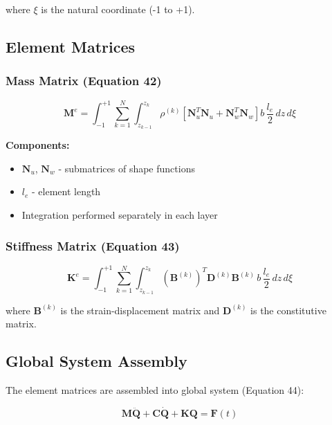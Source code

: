 \documentclass[12pt,a4paper]{article}
\begin{document}
where $\xi$ is the natural coordinate (-1 to +1).

\subsection{Element Matrices}

\subsubsection{Mass Matrix (Equation 42)}

\begin{equation}
    \mathbf{M}^e = \int_{-1}^{+1} \sum_{k=1}^{N} \int_{z_{k-1}}^{z_k}
\rho^{(k)} \left[ \mathbf{N}_u^T \mathbf{N}_u + \mathbf{N}_w^T \mathbf{N}_w \right] b \, \frac{l_e}{2} \, dz \, d\xi
\end{equation}

\textbf{Components:}
\begin{itemize}
\item $\mathbf{N}_u$, $\mathbf{N}_w$ - submatrices of shape functions
\item $l_e$ - element length
\item Integration performed separately in each layer
\end{itemize}

\subsubsection{Stiffness Matrix (Equation 43)}

\begin{equation}
    \mathbf{K}^e = \int_{-1}^{+1} \sum_{k=1}^{N} \int_{z_{k-1}}^{z_k}
(\mathbf{B}^{(k)})^T \mathbf{D}^{(k)} \mathbf{B}^{(k)} \, b \, \frac{l_e}{2} \, dz \, d\xi
\end{equation}

where $\mathbf{B}^{(k)}$ is the strain-displacement matrix and $\mathbf{D}^{(k)}$ is the constitutive matrix.

\subsection{Global System Assembly}

The element matrices are assembled into global system (Equation 44):

\begin{equation}
\mathbf{M} \ddot{\mathbf{Q}} + \mathbf{C} \dot{\mathbf{Q}} + \mathbf{K} \mathbf{Q} = \mathbf{F}(t)
\end{equation}
\end{document}
